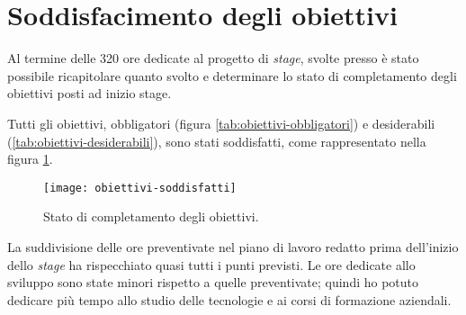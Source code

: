 \section{Soddisfacimento degli obiettivi}
Al termine delle 320 ore dedicate al progetto di \textit{stage}, svolte presso \azienda{} è stato possibile 
ricapitolare quanto svolto e determinare lo stato di completamento degli obiettivi posti
ad inizio stage.

\noindent Tutti gli obiettivi, obbligatori (figura \ref{tab:obiettivi-obbligatori}) e desiderabili (\ref{tab:obiettivi-desiderabili}), sono stati soddisfatti, 
come rappresentato nella figura \ref{fig:obiettivi-soddisfatti}.

\begin{figure}[!h] 
  \centering 
  \texttt{[image: obiettivi-soddisfatti]} 
  \caption{Stato di completamento degli obiettivi.}
  \label{fig:obiettivi-soddisfatti}
\end{figure}

La suddivisione delle ore preventivate nel piano di lavoro redatto prima dell’inizio
dello \textit{stage} ha rispecchiato quasi tutti i punti previsti. 
Le ore dedicate allo sviluppo sono state minori rispetto a quelle preventivate;
quindi ho potuto dedicare più tempo allo studio delle tecnologie e ai 
corsi di formazione aziendali.\\